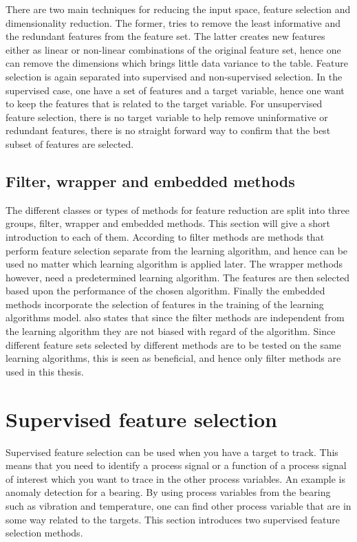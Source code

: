     There are two main techniques for reducing the input space, feature selection and dimensionality reduction. The former, tries to remove the least informative and the redundant features from the feature set. The latter creates new features either as linear or non-linear combinations of the original feature set, hence one can remove the dimensions which brings little data variance to the table. Feature selection is again separated into supervised and non-supervised selection. In the supervised case, one have a set of features and a target variable, hence one want to keep the features that is related to the target variable. For unsupervised feature selection, there is no target variable to help remove uninformative or redundant features, there is no straight forward way to confirm that the best subset of features are selected.
    
    
    \subsection{Filter, wrapper and embedded methods}\label{subsec:filter_wrapper_embedded}
        The different classes or types of methods for feature reduction are split into three groups, filter, wrapper and embedded methods. This section will give a short introduction to each of them.
        According to \cite{Liu2010} filter methods are methods that perform feature selection separate from the learning algorithm, and hence can be used no matter which learning algorithm is applied later. The wrapper methods however, need a predetermined learning algorithm. The features are then selected based upon the performance of the chosen algorithm.  Finally the embedded methods incorporate the selection of features in the training of the learning algorithms model.
        \cite{Liu2010} also states that since the filter methods are independent from the learning algorithm they are not biased with regard of the algorithm. Since different feature sets selected by different methods are to be tested on the same learning algorithms, this is seen as beneficial, and hence only filter methods are used in this thesis. 

\section{Supervised feature selection}\label{sec:sup_feat_select}
    Supervised feature selection can be used when you have a target to track. This means that you need to identify a process signal or a function of a process signal of interest which you want to trace in the other process variables. An example is anomaly detection for a bearing. By using process variables from the bearing such as vibration and temperature, one can find other process variable that are in some way related to the targets. This section introduces two supervised feature selection methods. 
    
